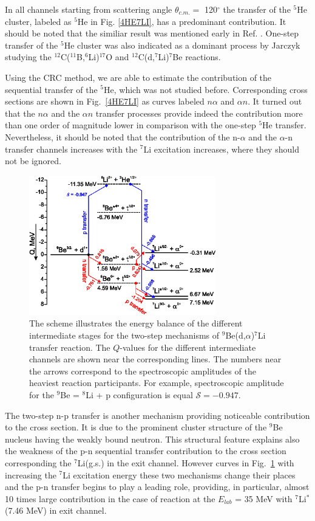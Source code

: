 \documentclass[10pt]{iopart}
\begin{document}
In all channels starting from scattering angle $\theta_{c.m.} =$ 120$^\circ$ the transfer of the ${}^5$He cluster, labeled as ${}^5$He in Fig. \ref{4HE7LI}, has a predominant contribution. It should be noted that the similiar result was mentioned early in Ref. \cite{bodek1989}. One-step transfer of the ${}^5$He cluster was also indicated as a dominant process by Jarczyk \etal \cite{jarczyk1996} studying the ${}^{12}$C(${}^{11}$B,${}^6$Li)${}^{17}$O and ${}^{12}$C(d,${}^7$Li)${}^{7}$Be reactions.

Using the CRC method, we are able to estimate the contribution of the sequential transfer of the ${}^5$He, which was not studied before. Corresponding cross sections are shown in Fig.~\ref{4HE7LI} as curves labeled $n\alpha$ and $\alpha n$.
It turned out that the $n\alpha$ and the $\alpha n$ transfer processes provide indeed the contribution more than one order of magnitude lower in comparison with the one-step ${}^5$He transfer. Nevertheless, it should be noted that the contribution of the n-$\alpha$ and the $\alpha$-n transfer channels increases with the ${}^7$Li excitation increases, where they should not be ignored.

\begin{figure}%
\centering
\includegraphics[width=230pt]{pnvsnp.eps}
\caption{\label{fig:pnvsnp} The scheme illustrates the energy balance of the different intermediate stages for the two-step mechanisms of ${}^9$Be(d,$\alpha$)${}^7$Li transfer reaction. The $Q$-values for the different intermediate channels are shown near the corresponding lines. The numbers near the arrows correspond to the spectroscopic amplitudes of the heaviest reaction participants. For example, spectroscopic amplitude for the ${}^9$Be = ${}^8$Li + p configuration is equal $\mathcal{S} = -0.947$.}
\end{figure}

The two-step n-p transfer is another mechanism providing noticeable contribution to the cross section. It is due to the prominent cluster structure of the ${}^9$Be nucleus having the weakly bound neutron. This structural feature explains also the weakness of the p-n sequential transfer contribution to the cross section corresponding the ${}^7$Li(g.s.) in the exit channel. However curves in Fig.~\ref{fig:pnvsnp} with increasing the ${}^7$Li excitation energy these two mechanisms change their places and the p-n transfer begins to play a leading role, providing, in particular, almost 10 times large contribution in the case of reaction at the $E_{lab}$ = 35 MeV with ${}^7$Li$^*$(7.46 MeV) in exit channel.
\end{document}
